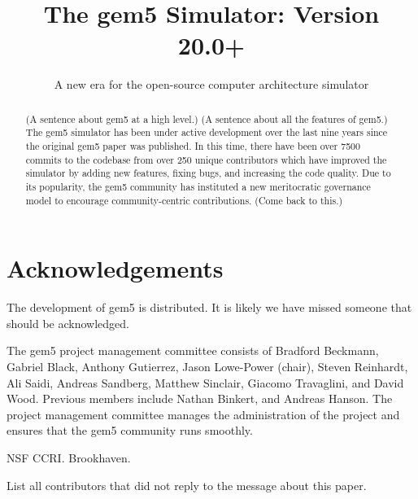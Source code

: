 \documentclass[manuscript, review, screen, timestamp]{acmart}
\begin{document}
\title{The gem5 Simulator: Version 20.0+}
\subtitle{A new era for the open-source computer architecture simulator}



\begin{abstract}
    (A sentence about gem5 at a high level.)
    (A sentence about all the features of gem5.)
    The gem5 simulator has been under active development over the last nine years since the original gem5 paper was published.
    In this time, there have been over 7500 commits to the codebase from over 250 unique contributors which have improved the simulator by adding new features, fixing bugs, and increasing the code quality.
    Due to its popularity, the gem5 community has instituted a new meritocratic governance model to encourage community-centric contributions.
    (Come back to this.)
\end{abstract}

\maketitle
\renewcommand{\shortauthors}{Lowe-Power and the gem5 Community}





\section{Acknowledgements}

The development of gem5 is distributed.
It is likely we have missed someone that should be acknowledged.

The gem5 project management committee consists of Bradford Beckmann, Gabriel Black, Anthony Gutierrez, Jason Lowe-Power (chair), Steven Reinhardt, Ali Saidi, Andreas Sandberg, Matthew Sinclair, Giacomo Travaglini, and David Wood.
Previous members include Nathan Binkert, and Andreas Hanson.
The project management committee manages the administration of the project and ensures that the gem5 community runs smoothly.

NSF CCRI. Brookhaven.

List all contributors that did not reply to the message about this paper.



\end{document}
